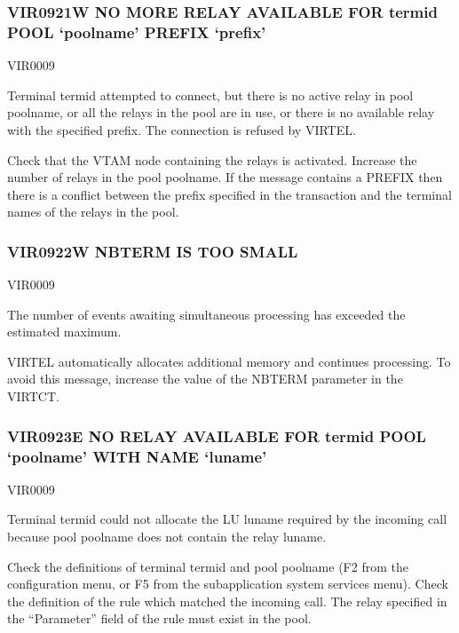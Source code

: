 \documentclass[letterpaper,10pt,english]{sphinxmanual}
\begin{document}
\subsubsection{VIR0921W NO MORE RELAY AVAILABLE FOR termid POOL ‘poolname’ PREFIX ‘prefix’}
\label{\detokenize{messages:vir0921w-no-more-relay-available-for-termid-pool-poolname-prefix-prefix}}\begin{description}
\sphinxAtStartPar
VIR0009

\sphinxAtStartPar
Terminal termid attempted to connect, but there is no active relay in pool poolname, or all the relays in the pool are in use, or there is no available relay with the specified prefix. The connection is refused by VIRTEL.

\sphinxAtStartPar
Check that the VTAM node containing the relays is activated. Increase the number of relays in the pool poolname.  If the message contains a PREFIX then there is a conflict between the prefix specified in the transaction and the terminal names of the relays in the pool.

\end{description}


\subsubsection{VIR0922W NBTERM IS TOO SMALL}
\label{\detokenize{messages:vir0922w-nbterm-is-too-small}}\begin{description}
\sphinxAtStartPar
VIR0009

\sphinxAtStartPar
The number of events awaiting simultaneous processing has exceeded the estimated maximum.

\sphinxAtStartPar
VIRTEL automatically allocates additional memory and continues processing. To avoid this message, increase the value of the NBTERM parameter in the VIRTCT.

\end{description}


\subsubsection{VIR0923E NO RELAY AVAILABLE FOR termid POOL ‘poolname’ WITH NAME ‘luname’}
\label{\detokenize{messages:vir0923e-no-relay-available-for-termid-pool-poolname-with-name-luname}}\begin{description}
\sphinxAtStartPar
VIR0009

\sphinxAtStartPar
Terminal termid could not allocate the LU luname required by the incoming call because pool poolname does not contain the relay luname.

\sphinxAtStartPar
Check the definitions of terminal termid and pool poolname (F2 from the configuration menu, or F5 from the sub\sphinxhyphen{}application system services menu). Check the definition of the rule which matched the incoming call. The relay specified in the “Parameter” field of the rule must exist in the pool.

\end{description}
\end{document}
